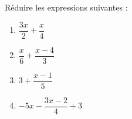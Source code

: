 
\begin{exercice}\label{exo2smath-0108}

Réduire les expressions suivantes :
\begin{multicols}{2}
    \begin{enumerate}
        \item
            \( \dfrac{ 3x }{ 2 }+\dfrac{ x }{ 4 }\)
        \item
            \( \dfrac{ x }{ 6 }+\dfrac{ x-4 }{ 3 }\)
        \item
            \( 3+\dfrac{ x-1 }{ 5 }\)
        \item
            \( -5x-\dfrac{ 3x-2 }{ 4 }+3\)
    \end{enumerate}
\end{multicols}

\end{exercice}
